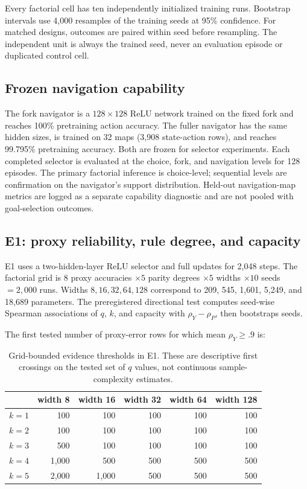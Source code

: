 \documentclass[11pt,a4paper]{article}
\newcommand{\rhoY}{\rho_Y}
\newcommand{\rhoP}{\rho_P}
\begin{document}
Every factorial cell has ten independently initialized training runs. Bootstrap intervals use 4,000 resamples of the training seeds at 95\% confidence. For matched designs, outcomes are paired within seed before resampling. The independent unit is always the trained seed, never an evaluation episode or duplicated control cell.

\subsection{Frozen navigation capability}

The fork navigator is a $128\times128$ ReLU network trained on the fixed fork and reaches 100\% pretraining action accuracy. The fuller navigator has the same hidden sizes, is trained on 32 maps (3,908 state-action rows), and reaches 99.795\% pretraining accuracy. Both are frozen for selector experiments. Each completed selector is evaluated at the choice, fork, and navigation levels for 128 episodes. The primary factorial inference is choice-level; sequential levels are confirmation on the navigator's support distribution. Held-out navigation-map metrics are logged as a separate capability diagnostic and are not pooled with goal-selection outcomes.

\subsection{E1: proxy reliability, rule degree, and capacity}

E1 uses a two-hidden-layer ReLU selector and full updates for 2,048 steps. The factorial grid is $8$ proxy accuracies $\times5$ parity degrees $\times5$ widths $\times10$ seeds $=2{,}000$ runs. Widths $8,16,32,64,128$ correspond to 209, 545, 1,601, 5,249, and 18,689 parameters. The preregistered directional test computes seed-wise Spearman associations of $q$, $k$, and capacity with $\rhoY-\rhoP$, then bootstraps seeds.

The first tested number of proxy-error rows for which mean $\rhoY\geq.9$ is:

\begin{table}[h]
\centering
\begin{tabular}{lrrrrr}
\toprule
 & width 8 & width 16 & width 32 & width 64 & width 128 \\
\midrule
$k=1$ & 100 & 100 & 100 & 100 & 100 \\
$k=2$ & 100 & 100 & 100 & 100 & 100 \\
$k=3$ & 500 & 100 & 100 & 100 & 100 \\
$k=4$ & 1,000 & 500 & 500 & 500 & 500 \\
$k=5$ & 2,000 & 1,000 & 500 & 500 & 500 \\
\bottomrule
\end{tabular}
\caption{Grid-bounded evidence thresholds in E1. These are descriptive first crossings on the tested set of $q$ values, not continuous sample-complexity estimates.}
\label{tab:e1thresholds}
\end{table}
\end{document}
